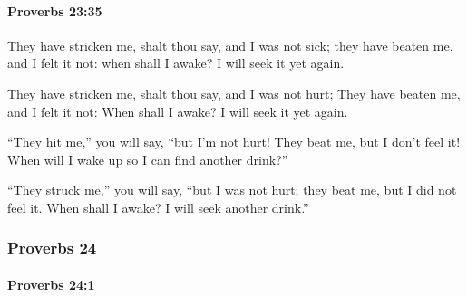 		\paragraph{Proverbs 23:35} %
			\label{PROVERBS-23-35}

			They have stricken me, shalt thou say, and I was not sick; they have beaten me, and I felt it not: when shall I awake? I will seek it yet again.

			\begin{versebox}
					\item[BHS] 
					\item[ASV] They have stricken me, shalt thou say, and I was not hurt; They have beaten me, and I felt it not: When shall I awake? I will seek it yet again.
					\item[NIV] “They hit me,” you will say, “but I’m not hurt! They beat me, but I don’t feel it! When will I wake up so I can find another drink?”
					\item[NRSV] “They struck me,” you will say, “but I was not hurt; they beat me, but I did not feel it. When shall I awake? I will seek another drink.”
			\end{versebox}
	\subsubsection{Proverbs 24} %
		\label{PROVERBS-24}

		\paragraph{Proverbs 24:1} %
			\label{PROVERBS-24-1}

